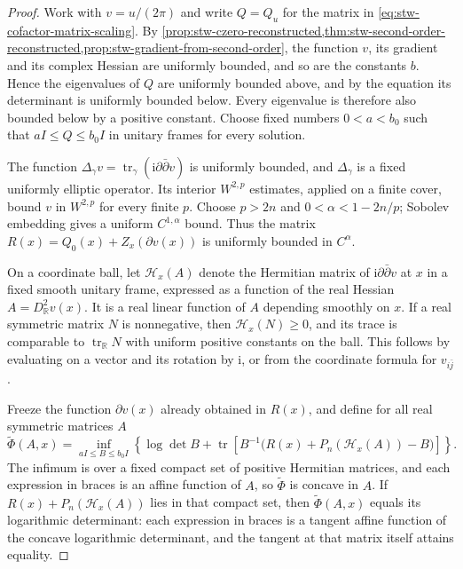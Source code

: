 \begin{proof}
Work with $v=u/(2\pi)$ and write $Q=Q_u$ for the matrix in \eqref{eq:stw-cofactor-matrix-scaling}. By \cref{prop:stw-czero-reconstructed,thm:stw-second-order-reconstructed,prop:stw-gradient-from-second-order}, the function $v$, its gradient and its complex Hessian are uniformly bounded, and so are the constants $b$. Hence the eigenvalues of $Q$ are uniformly bounded above, and by the equation its determinant is uniformly bounded below. Every eigenvalue is therefore also bounded below by a positive constant. Choose fixed numbers $0<a<b_0$ such that $aI\leq Q\leq b_0I$ in unitary frames for every solution.

The function $\Delta_\gamma v=\operatorname{tr}_\gamma(\mathrm i\partial\bar\partial v)$ is uniformly bounded, and $\Delta_\gamma$ is a fixed uniformly elliptic operator. Its interior $W^{2,p}$ estimates, applied on a finite cover, bound $v$ in $W^{2,p}$ for every finite $p$. Choose $p>2n$ and $0<\alpha<1-2n/p$; Sobolev embedding gives a uniform $C^{1,\alpha}$ bound. Thus the matrix $R(x)=Q_0(x)+Z_x(\partial v(x))$ is uniformly bounded in $C^\alpha$.

On a coordinate ball, let $\mathcal H_x(A)$ denote the Hermitian matrix of $\mathrm i\partial\bar\partial v$ at $x$ in a fixed smooth unitary frame, expressed as a function of the real Hessian $A=D^2_{\mathbb R}v(x)$. It is a real linear function of $A$ depending smoothly on $x$. If a real symmetric matrix $N$ is nonnegative, then $\mathcal H_x(N)\geq0$, and its trace is comparable to $\operatorname{tr}_{\mathbb R}N$ with uniform positive constants on the ball. This follows by evaluating on a vector and its rotation by $\mathrm i$, or from the coordinate formula for $v_{i\bar j}$.

Freeze the function $\partial v(x)$ already obtained in $R(x)$, and define for all real symmetric matrices $A$
\[
 \widetilde\Phi(A,x)=
  \inf_{aI\leq B\leq b_0I}
    \left\{\log\det B+
       \operatorname{tr}\left[B^{-1}
          \bigl(R(x)+P_n(\mathcal H_x(A))-B\bigr)\right]\right\}.
\]
The infimum is over a fixed compact set of positive Hermitian matrices, and each expression in braces is an affine function of $A$, so $\widetilde\Phi$ is concave in $A$. If $R(x)+P_n(\mathcal H_x(A))$ lies in that compact set, then $\widetilde\Phi(A,x)$ equals its logarithmic determinant: each expression in braces is a tangent affine function of the concave logarithmic determinant, and the tangent at that matrix itself attains equality.


\end{proof}
